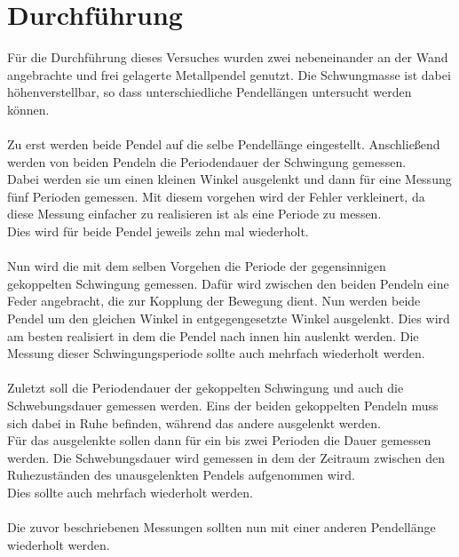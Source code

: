 \newpage
\section{Durchführung}
Für die Durchführung dieses Versuches wurden zwei nebeneinander an der Wand angebrachte und frei gelagerte Metallpendel genutzt. 
Die Schwungmasse ist dabei höhenverstellbar, so dass unterschiedliche Pendellängen untersucht werden können.\\\\
Zu erst werden beide Pendel auf die selbe Pendellänge eingestellt. Anschließend werden von beiden Pendeln die Periodendauer der Schwingung gemessen.\\
Dabei werden sie um einen kleinen Winkel ausgelenkt und dann für eine Messung fünf Perioden gemessen. 
Mit diesem vorgehen wird der Fehler verkleinert, da diese Messung einfacher zu realisieren ist als eine Periode zu messen.\\
Dies wird für beide Pendel jeweils zehn mal wiederholt.\\\\
Nun wird die mit dem selben Vorgehen die Periode der gegensinnigen gekoppelten Schwingung gemessen. 
Dafür wird zwischen den beiden Pendeln eine Feder angebracht, die zur Kopplung der Bewegung dient.
Nun werden beide Pendel um den gleichen Winkel in entgegengesetzte Winkel ausgelenkt. Dies wird am besten realisiert in dem die Pendel nach innen hin auslenkt werden. 
Die Messung dieser Schwingungsperiode sollte auch mehrfach wiederholt werden.\\\\
Zuletzt soll die Periodendauer der gekoppelten Schwingung und auch die Schwebungsdauer gemessen werden. 
Eins der beiden gekoppelten Pendeln muss sich dabei in Ruhe befinden, während das andere ausgelenkt werden. \\
Für das ausgelenkte sollen dann für ein bis zwei Perioden die Dauer gemessen werden.
Die Schwebungsdauer wird gemessen in dem der Zeitraum zwischen den Ruhezuständen des unausgelenkten Pendels aufgenommen wird.\\
Dies sollte auch mehrfach wiederholt werden.\\\\

\noindent
Die zuvor beschriebenen Messungen sollten nun mit einer anderen Pendellänge wiederholt werden.




